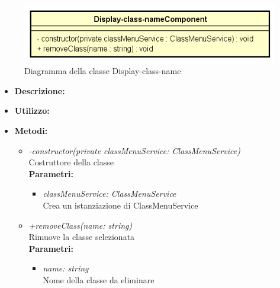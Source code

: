 \begin{figure}[h!]
	\centering
	\includegraphics[scale=0.8]{res/sections/SpecificaFrontEnd/Components/Disegnetti/display-class-name.png}
	\caption{Diagramma della classe Display-class-name}
\end{figure}

\begin{itemize}
	\item \textbf{Descrizione:}\\
	
	\item \textbf{Utilizzo:}\\
	
	\item \textbf{Metodi:}
		\begin{itemize}
			\item \emph{-constructor(private classMenuService: ClassMenuService)}\\
    		Costruttore della classe\\
    		\textbf{Parametri:}
    		\begin{itemize}
    			\item \emph{classMenuService: ClassMenuService}\\
    			Crea un istanziazione di ClassMenuService
    		\end{itemize}
    		\item \emph{+removeClass(name: string)}\\
    		Rimuove la classe selezionata\\
    		\textbf{Parametri:}
    		\begin{itemize}
    			\item \emph{name: string}\\
    			Nome della classe da eliminare
    		\end{itemize}
		\end{itemize}
\end{itemize}
